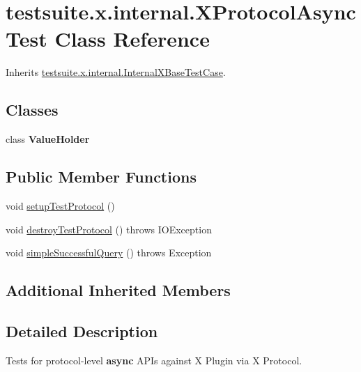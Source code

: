 \hypertarget{classtestsuite_1_1x_1_1internal_1_1_x_protocol_async_test}{}\section{testsuite.\+x.\+internal.\+X\+Protocol\+Async\+Test Class Reference}
\label{classtestsuite_1_1x_1_1internal_1_1_x_protocol_async_test}


Inherits \mbox{\hyperlink{classtestsuite_1_1x_1_1internal_1_1_internal_x_base_test_case}{testsuite.\+x.\+internal.\+Internal\+X\+Base\+Test\+Case}}.

\subsection*{Classes}
\begin{DoxyCompactItemize}
\item 
class {\bfseries Value\+Holder}
\end{DoxyCompactItemize}
\subsection*{Public Member Functions}
\begin{DoxyCompactItemize}
\item 
void \mbox{\hyperlink{classtestsuite_1_1x_1_1internal_1_1_x_protocol_async_test_a2f32ab0cc64c56db3c3a71639955398e}{setup\+Test\+Protocol}} ()
\item 
void \mbox{\hyperlink{classtestsuite_1_1x_1_1internal_1_1_x_protocol_async_test_a62b8ad9419eb87388de88604701812ae}{destroy\+Test\+Protocol}} ()  throws I\+O\+Exception 
\item 
void \mbox{\hyperlink{classtestsuite_1_1x_1_1internal_1_1_x_protocol_async_test_a6d0464b3c0ac1fb46fb114a7fbf19fae}{simple\+Successful\+Query}} ()  throws Exception 
\end{DoxyCompactItemize}
\subsection*{Additional Inherited Members}


\subsection{Detailed Description}
Tests for protocol-\/level {\bfseries async} A\+P\+Is against X Plugin via X Protocol. 

